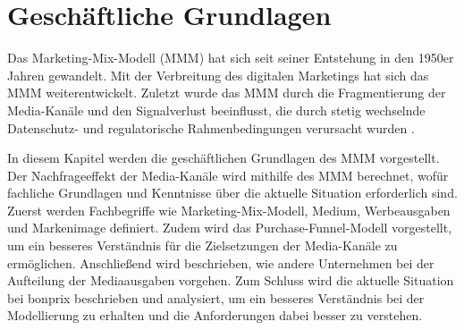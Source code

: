 \newpage
\section{Geschäftliche Grundlagen}
\label{GeschäftlicheGrundlagen}
Das Marketing-Mix-Modell (\ac{MMM}) hat sich seit seiner Entstehung in den 1950er Jahren gewandelt. Mit der Verbreitung des digitalen Marketings hat sich das \ac{MMM} weiterentwickelt. Zuletzt wurde das \ac{MMM} durch die Fragmentierung der Media-Kanäle und den Signalverlust beeinflusst, die durch stetig wechselnde Datenschutz- und regulatorische Rahmenbedingungen verursacht wurden \cite[1]{MMMdef}. \par
In diesem Kapitel werden die geschäftlichen Grundlagen des \ac{MMM} vorgestellt. Der Nachfrageeffekt der Media-Kanäle wird mithilfe des \ac{MMM} berechnet, wofür fachliche Grundlagen und Kenntnisse über die aktuelle Situation erforderlich sind. Zuerst werden Fachbegriffe wie Marketing-Mix-Modell, Medium, Werbeausgaben und Markenimage definiert. Zudem wird das Purchase-Funnel-Modell vorgestellt, um ein besseres Verständnis für die Zielsetzungen der Media-Kanäle zu ermöglichen. Anschließend wird beschrieben, wie andere Unternehmen bei der Aufteilung der Mediaausgaben vorgehen. Zum Schluss wird die aktuelle Situation bei bonprix beschrieben und analysiert, um ein besseres Verständnis bei der Modellierung zu erhalten und die Anforderungen dabei besser zu verstehen.
